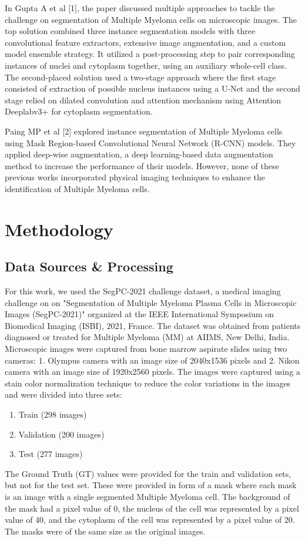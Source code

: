 \documentclass{article}
\begin{document}
In Gupta A et al [1], the paper discussed multiple approaches to tackle the challenge on segmentation of Multiple Myeloma cells on microscopic images. The top solution combined three instance segmentation models with three convolutional feature extractors, extensive image augmentation, and a custom model ensemble strategy. It utilized a post-processing step to pair corresponding instances of nuclei and cytoplasm together, using an auxiliary whole-cell class. The second-placed solution used a two-stage approach where the first stage consisted of extraction of possible nucleus instances using a U-Net and the second stage relied on dilated convolution and attention mechanism using Attention Deeplabv3+ for cytoplasm segmentation.

Paing MP et al [2] explored instance segmentation of Multiple Myeloma cells using Mask Region-based Convolutional Neural Network (R-CNN) models. They applied deep-wise augmentation, a deep learning-based data augmentation method to increase the performance of their models. However, none of these previous works incorporated physical imaging techniques to enhance the identification of Multiple Myeloma cells.

\section{Methodology}
\subsection{Data Sources \& Processing}
For this work, we used the SegPC-2021 challenge dataset, a medical imaging challenge on on "Segmentation of Multiple Myeloma Plasma Cells in Microscopic Images (SegPC-2021)" organized at the IEEE International Symposium on Biomedical Imaging (ISBI), 2021, France. The dataset was obtained from patients diagnosed or treated for Multiple Myeloma (MM) at AIIMS, New Delhi, India. Microscopic images were captured from bone marrow aspirate slides using two cameras: 1. Olympus camera with an image size of 2040x1536 pixels and 2. Nikon camera with an image size of 1920x2560 pixels. The images were captured using a stain color normalization technique to reduce the color variations in the images and were divided into three sets:
\begin{enumerate}
  \item Train (298 images)
  \item Validation (200 images)
  \item Test (277 images)
\end{enumerate}
The Ground Truth (GT) values were provided for the train and validation sets, but not for the test set. These were provided in form of a mask where each mask is an image with a single segmented Multiple Myeloma cell. The background of the mask had a pixel value of 0, the nucleus of the cell was represented by a pixel value of 40, and the cytoplasm of the cell was represented by a pixel value of 20. The masks were of the same size as the original images.
\end{document}
